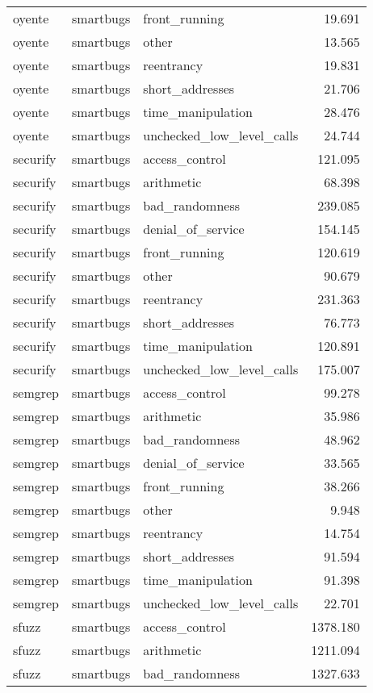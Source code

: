 \begin{tabular}[t]{lllr}
oyente & smartbugs & front\_running & 19.691\\
\addlinespace
oyente & smartbugs & other & 13.565\\
oyente & smartbugs & reentrancy & 19.831\\
oyente & smartbugs & short\_addresses & 21.706\\
oyente & smartbugs & time\_manipulation & 28.476\\
oyente & smartbugs & unchecked\_low\_level\_calls & 24.744\\
\addlinespace
securify & smartbugs & access\_control & 121.095\\
securify & smartbugs & arithmetic & 68.398\\
securify & smartbugs & bad\_randomness & 239.085\\
securify & smartbugs & denial\_of\_service & 154.145\\
securify & smartbugs & front\_running & 120.619\\
\addlinespace
securify & smartbugs & other & 90.679\\
securify & smartbugs & reentrancy & 231.363\\
securify & smartbugs & short\_addresses & 76.773\\
securify & smartbugs & time\_manipulation & 120.891\\
securify & smartbugs & unchecked\_low\_level\_calls & 175.007\\
\addlinespace
semgrep & smartbugs & access\_control & 99.278\\
semgrep & smartbugs & arithmetic & 35.986\\
semgrep & smartbugs & bad\_randomness & 48.962\\
semgrep & smartbugs & denial\_of\_service & 33.565\\
semgrep & smartbugs & front\_running & 38.266\\
\addlinespace
semgrep & smartbugs & other & 9.948\\
semgrep & smartbugs & reentrancy & 14.754\\
semgrep & smartbugs & short\_addresses & 91.594\\
semgrep & smartbugs & time\_manipulation & 91.398\\
semgrep & smartbugs & unchecked\_low\_level\_calls & 22.701\\
\addlinespace
sfuzz & smartbugs & access\_control & 1378.180\\
sfuzz & smartbugs & arithmetic & 1211.094\\
sfuzz & smartbugs & bad\_randomness & 1327.633\\

\end{tabular}
